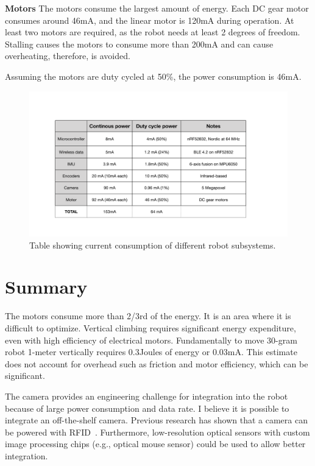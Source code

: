 \textbf{Motors}
The motors consume the largest amount of energy. Each DC gear motor consumes around 46mA, and the linear motor is 120mA during operation. At least two motors are required, as the robot needs at least 2 degrees of freedom. Stalling causes the motors to consume more than 200mA and can cause overheating, therefore, is avoided. 

Assuming the motors are duty cycled at 50\%, the power consumption is 46mA. 

\begin{figure}[!ht]
\centering
\includegraphics[width=14.0cm]{pictures/power_consumption_pics/power_graph.pdf}
\caption{Table showing current consumption of different robot subsystems. }
\label{fig:power_con_compare}
\end{figure}

\section{Summary}
The motors consume more than 2/3rd of the energy. It is an area where it is difficult to optimize. Vertical climbing requires significant energy expenditure, even with high efficiency of electrical motors. Fundamentally to move 30-gram robot 1-meter vertically requires 0.3Joules of energy or 0.03mA. This estimate does not account for overhead such as friction and motor efficiency, which can be significant. %

The camera provides an engineering challenge for integration into the robot because of large power consumption and data rate. I believe it is possible to integrate an off-the-shelf camera. Previous research has shown that a camera can be powered with RFID~\cite{naderiparizi2015wispcam}. Furthermore, low-resolution optical sensors with custom image processing chips (e.g., optical mouse sensor) could be used to allow better integration. 


